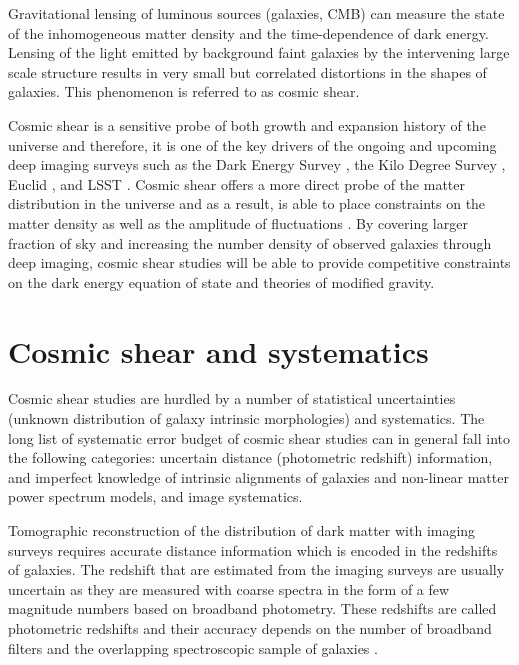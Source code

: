 Gravitational lensing of luminous sources (galaxies, CMB) can measure 
the state of the inhomogeneous matter density and the time-dependence of dark energy. 
Lensing of the light emitted by background faint galaxies by the intervening large scale structure 
results in very small but correlated distortions in the shapes of galaxies. This phenomenon is referred to 
as cosmic shear. 

Cosmic shear is a sensitive probe of both growth and expansion history of the universe and therefore, it 
is one of the key drivers of the ongoing and upcoming deep imaging surveys such as the Dark Energy Survey \citep{DES}, 
the Kilo Degree Survey \citep{hildebrandt2017}, Euclid \citep{euclid}, and LSST \citep{desc}. Cosmic shear offers a more 
direct probe of the matter distribution in the universe and as a result, is able to place constraints on the matter density 
as well as the amplitude of fluctuations \citep{heymans,abbot2016,joudaki2016,hildebrandt2017}. By covering larger fraction of 
sky and increasing the number density of observed galaxies through deep imaging, cosmic shear studies will be able to 
provide competitive constraints on the dark energy equation of state and theories of modified gravity.  

\section{Cosmic shear and systematics}

Cosmic shear studies are hurdled by a number of statistical uncertainties (unknown distribution 
of galaxy intrinsic morphologies) and systematics. The long list of systematic error budget 
of cosmic shear studies can in general fall into the following categories: uncertain distance 
(photometric redshift) information, and imperfect knowledge of intrinsic alignments of galaxies and non-linear matter 
power spectrum models, and image systematics. 

Tomographic reconstruction of the distribution of dark matter with imaging surveys requires 
accurate distance information which is encoded in the redshifts of galaxies. 
The redshift that are estimated from the imaging surveys are usually uncertain as they are measured with coarse 
spectra in the form of a few magnitude numbers based on broadband photometry. These redshifts are called 
photometric redshifts and their accuracy depends on the number of broadband filters and the overlapping spectroscopic 
sample of galaxies \citep{bonnett2016,choi2016,boris2016,hildebrandt2017}. %

